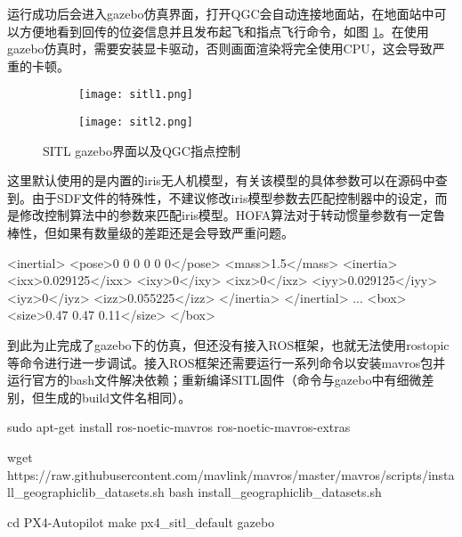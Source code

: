 运行成功后会进入gazebo仿真界面，打开QGC会自动连接地面站，在地面站中可以方便地看到回传的位姿信息并且发布起飞和指点飞行命令，如图 \ref{sitl}。在使用gazebo仿真时，需要安装显卡驱动，否则画面渲染将完全使用CPU，这会导致严重的卡顿。
\begin{figure}[h]
  \centering
     \begin{subfigure}[c]{0.45\textwidth}
      \centering
      \texttt{[image: sitl1.png]}
   \end{subfigure}%
     \begin{subfigure}[c]{0.45\textwidth}
      \centering
      \texttt{[image: sitl2.png]}
   \end{subfigure}
   \caption{SITL gazebo界面以及QGC指点控制}
   \label{sitl}
 \end{figure}
 这里默认使用的是内置的iris无人机模型，有关该模型的具体参数可以在源码\cite{px4}中查到。由于SDF文件的特殊性，不建议修改iris模型参数去匹配控制器中的设定，而是修改控制算法中的参数来匹配iris模型。HOFA算法对于转动惯量参数有一定鲁棒性，但如果有数量级的差距还是会导致严重问题。
 \begin{codeblock}[language=C]
  <inertial>
    <pose>0 0 0 0 0 0</pose>
    <mass>1.5</mass>
    <inertia>
      <ixx>0.029125</ixx>
      <ixy>0</ixy>
      <ixz>0</ixz>
      <iyy>0.029125</iyy>
      <iyz>0</iyz>
      <izz>0.055225</izz>
    </inertia>
  </inertial>
...
<box>
  <size>0.47 0.47 0.11</size>
</box>
 \end{codeblock}

到此为止完成了gazebo下的仿真，但还没有接入ROS框架，也就无法使用rostopic等命令进行进一步调试。接入ROS框架还需要运行一系列命令以安装mavros包并运行官方的bash文件解决依赖；重新编译SITL固件（命令与gazebo中有细微差别，但生成的build文件名相同）。
\begin{codeblock}
  sudo apt-get install ros-noetic-mavros ros-noetic-mavros-extras

  wget https://raw.githubusercontent.com/mavlink/mavros/master/mavros/scripts/install_geographiclib_datasets.sh
  bash install_geographiclib_datasets.sh

  cd PX4-Autopilot
  make px4_sitl_default gazebo
\end{codeblock}

